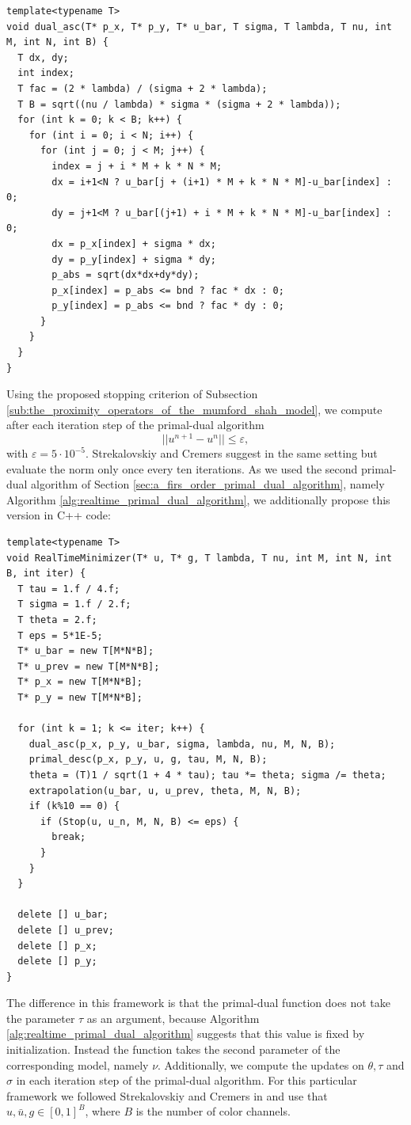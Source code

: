 \documentclass[abstracton]{scrreprt}
\begin{document}
        \begin{lstlisting}
template<typename T>
void dual_asc(T* p_x, T* p_y, T* u_bar, T sigma, T lambda, T nu, int M, int N, int B) {
  T dx, dy;
  int index;
  T fac = (2 * lambda) / (sigma + 2 * lambda);
  T B = sqrt((nu / lambda) * sigma * (sigma + 2 * lambda));
  for (int k = 0; k < B; k++) {
    for (int i = 0; i < N; i++) {
      for (int j = 0; j < M; j++) {
        index = j + i * M + k * N * M;
        dx = i+1<N ? u_bar[j + (i+1) * M + k * N * M]-u_bar[index] : 0;
        dy = j+1<M ? u_bar[(j+1) + i * M + k * N * M]-u_bar[index] : 0;
        dx = p_x[index] + sigma * dx;
        dy = p_y[index] + sigma * dy;
        p_abs = sqrt(dx*dx+dy*dy);
        p_x[index] = p_abs <= bnd ? fac * dx : 0;
        p_y[index] = p_abs <= bnd ? fac * dy : 0;
      }
    }
  }
}
        \end{lstlisting}
        Using the proposed stopping criterion of Subsection \ref{sub:the_proximity_operators_of_the_mumford_shah_model}, we compute after each iteration step of the primal-dual algorithm
            $$
                ||u^{n+1} - u^{n}|| \le \varepsilon,
            $$
        with $\varepsilon = 5 \cdot 10^{-5}$. Strekalovskiy and Cremers suggest in \cite{Strekalovskiy-Cremers-eccv14} the same setting but evaluate the norm only once every ten iterations. As we used the second primal-dual algorithm of Section \ref{sec:a_firs_order_primal_dual_algorithm}, namely Algorithm \ref{alg:realtime_primal_dual_algorithm}, we additionally propose this version in C++ code:
        \begin{lstlisting}
template<typename T>
void RealTimeMinimizer(T* u, T* g, T lambda, T nu, int M, int N, int B, int iter) {
  T tau = 1.f / 4.f;
  T sigma = 1.f / 2.f;
  T theta = 2.f;
  T eps = 5*1E-5;
  T* u_bar = new T[M*N*B];
  T* u_prev = new T[M*N*B];
  T* p_x = new T[M*N*B];
  T* p_y = new T[M*N*B];

  for (int k = 1; k <= iter; k++) {
    dual_asc(p_x, p_y, u_bar, sigma, lambda, nu, M, N, B);
    primal_desc(p_x, p_y, u, g, tau, M, N, B);
    theta = (T)1 / sqrt(1 + 4 * tau); tau *= theta; sigma /= theta;
    extrapolation(u_bar, u, u_prev, theta, M, N, B);
    if (k%10 == 0) {
      if (Stop(u, u_n, M, N, B) <= eps) {
        break;
      }
    }
  }

  delete [] u_bar;
  delete [] u_prev;
  delete [] p_x;
  delete [] p_y;
}
        \end{lstlisting}
        The difference in this framework is that the primal-dual function does not take the parameter $\tau$ as an argument, because Algorithm \ref{alg:realtime_primal_dual_algorithm} suggests that this value is fixed by initialization. Instead the function takes the second parameter of the corresponding model, namely $\nu$. Additionally, we compute the updates on $\theta, \tau$ and $\sigma$ in each iteration step of the primal-dual algorithm. For this particular framework we followed Strekalovskiy and Cremers in \cite{Strekalovskiy-Cremers-eccv14} and use that $u, \bar{u}, g \in [0,1]^{B}$, where $B$ is the number of color channels.
\end{document}
